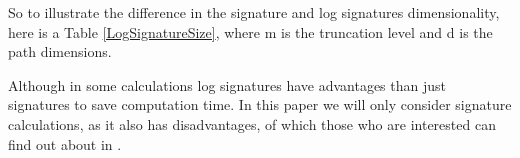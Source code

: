 \documentclass[12pt,a4paper]{report}
\theoremstyle{definition}
\newtheorem{theorem}{Theorem}
\begin{document}
So to illustrate the difference in the signature and log signatures dimensionality, here is a Table \ref{LogSignatureSize}, where m is the truncation level and d is the path dimensions.


Although in some calculations log signatures have advantages than just signatures to save computation time. In this paper we will only consider signature calculations, as it also has disadvantages, of which those who are interested can find out about in \parencite{chevyrev2016primer}.




%
%
%














\end{document}
